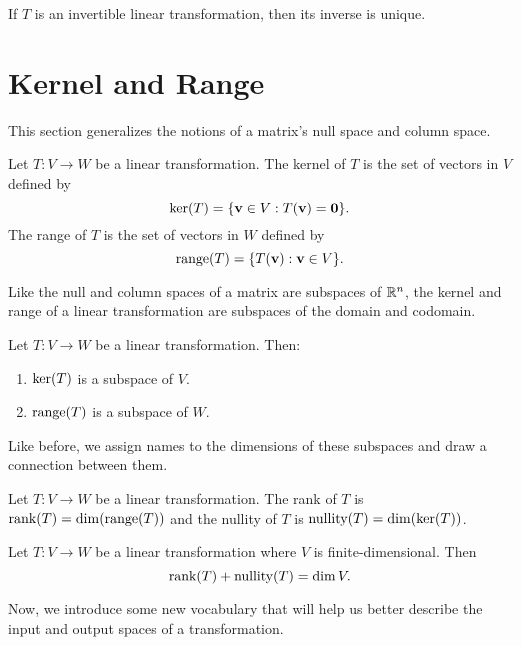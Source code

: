 \documentclass[../m73main.tex]{subfiles}
\begin{document}
\begin{theorem}
	If $T$ is an invertible linear transformation, then its inverse is unique.
\end{theorem}

\section{Kernel and Range}
This section generalizes the notions of a matrix's null space and column space.

\begin{definition}
	Let $T : V \to W$ be a linear transformation.
	The kernel of $T$ is the set of vectors in $V$ defined by
	\[ \textrm{ker}(T) = \{\mathbf{v} \in V : T(\mathbf{v}) = \mathbf{0}\}. \]
	The range of $T$ is the set of vectors in $W$ defined by
	\[ \textrm{range}(T) = \{T(\mathbf{v}) : \mathbf{v} \in V\}. \]
\end{definition}

Like the null and column spaces of a matrix are subspaces of $\mathbb{R}^n$, the kernel and range of a linear transformation are subspaces of the domain and codomain.

\begin{theorem}
	Let $T : V \to W$ be a linear transformation.
	Then:
	\begin{enumerate}[label=(\alph*)]
		\item $\textrm{ker}(T)$ is a subspace of $V$.
		\item $\textrm{range}(T)$ is a subspace of $W$.
	\end{enumerate}
\end{theorem}

Like before, we assign names to the dimensions of these subspaces and draw a connection between them.

\begin{definition}
	Let $T : V \to W$ be a linear transformation.
	The rank of $T$ is $\textrm{rank}(T) = \dim (\textrm{range}(T))$ and the nullity of $T$ is $\textrm{nullity}(T) = \dim (\textrm{ker}(T))$.
\end{definition}

\begin{theorem}
	Let $T : V \to W$ be a linear transformation where $V$ is finite-dimensional.
	Then
	\[ \textrm{rank}(T) + \textrm{nullity}(T) = \dim V. \]
\end{theorem}

Now, we introduce some new vocabulary that will help us better describe the input and output spaces of a transformation.
\end{document}
